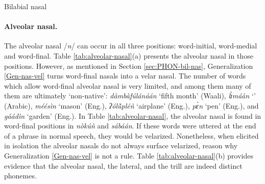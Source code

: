 \begin{table}[htb] \small
\centering
\caption{Bilabial nasal\label{tab:bilabial-nasal}}

\quad
{}
\end{table}


\paragraph{Alveolar nasal.}

The alveolar nasal  /{\it n}/ can occur in all three positions: word-initial, 
word-medial and word-final. Table \ref{tab:alveolar-nasal}(a) presents the 
alveolar nasal in those positions.  However,  as mentioned in Section 
\ref{sec:PHON-bil-nas},  Generalization \ref{Gen-nas-vel} turns 
word-final 
nasals into a 
velar nasal. The number of words which allow word-final alveolar nasal is very 
limited, and among them many of them are ultimately `non-native': {\it 
dàmbàfúlánáán} `fifth month' (Waali),  {\it lɪ̀máàn} `' (Arabic),  {\it méésìn} 
`mason' (Eng.),  {\it ʔólŭ̀pléǹ} `airplane' (Eng.),  {\it pɛ̀n} `pen'  (Eng.), 
and  {\it gáádìn} `garden'  (Eng.). In Table \ref{tab:alveolar-nasal}, the 
alveolar nasal is found in word-final positions in  {\it nòkúǹ} and {\it  
sábáán}. If these words were  uttered at the end of a phrase in normal 
speech, they would be  velarized. Nonetheless, when elicited in isolation the 
alveolar nasals  do not always surface velarized, reason why Generalization 
\ref{Gen-nas-vel} is not a rule. Table \ref{tab:alveolar-nasal}(b) 
provides 
evidence that the alveolar nasal, the lateral, and the trill  are indeed 
distinct phonemes.


